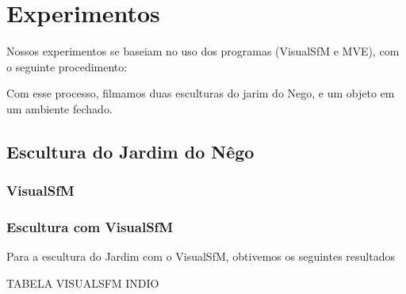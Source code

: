 \documentclass[table, usenames, svgnames, xcolor=dvipsnames]{beamer}
\begin{document}
\section{Experimentos}

\begin{frame}
	\begin{center}
		Nossos experimentos se baseiam no uso dos programas (VisualSfM e MVE), com o seguinte procedimento:
	\end{center}
\end{frame}

\begin{frame}
	\begin{center}
	\end{center}
\end{frame}

\begin{frame}
	\begin{center}
		Com esse processo, filmamos duas esculturas do jarim do Nego, e um objeto em um ambiente fechado. 
	\end{center}
\end{frame}

\subsection{Escultura do Jardim do Nêgo}


\subsubsection{VisualSfM}

\begin{frame}
	\begin{center}
	\end{center}
\end{frame}

\begin{frame}
\frametitle{\textbf{Escultura com VisualSfM}}
	Para a escultura do Jardim com o VisualSfM, obtivemos os seguintes resultados
	
	TABELA VISUALSFM INDIO
\end{frame}
\end{document}
